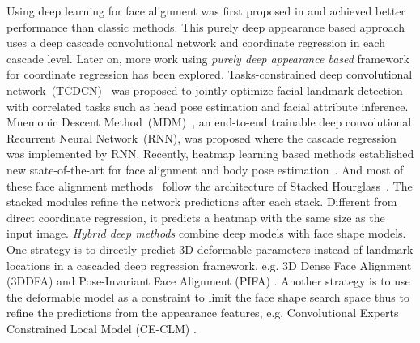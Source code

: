 \documentclass{article}
\begin{document}
Using deep learning for face alignment was first proposed in \cite{Sun13cnncFaceAlignment} and achieved better performance than classic methods. This purely deep appearance based approach uses a deep cascade convolutional network and coordinate regression in each cascade level. Later on, more work using \emph{purely deep appearance based} framework for coordinate regression has been explored. Tasks-constrained deep convolutional network~(TCDCN)~\cite{Zhang14TCDCN} was proposed to jointly optimize facial landmark detection with correlated tasks such as head pose estimation and facial attribute inference. Mnemonic Descent Method~(MDM)~\cite{Trigeorgis16MDM}, an end-to-end trainable deep convolutional Recurrent Neural Network~(RNN), was proposed where the cascade regression was implemented by RNN. Recently, heatmap learning based methods established new state-of-the-art for face alignment and body pose estimation~\cite{Tompson14heatmapPose,Newell16Hourglass,Wei16openpose}. And most of these face alignment methods~\cite{Bulat17FAN,wayne2018LAB} follow the architecture of Stacked Hourglass~\cite{Newell16Hourglass}. The stacked modules refine the network predictions after each stack. Different from direct coordinate regression, it predicts a heatmap with the same size as the input image. 
\emph{Hybrid deep methods} combine deep models with face shape models. One strategy is to directly predict 3D deformable parameters instead of landmark locations in a cascaded deep regression framework, e.g. 3D Dense Face Alignment (3DDFA) \cite{zhu17_3DDFA_300WLP} and Pose-Invariant Face Alignment (PIFA) \cite{Jourabloo2017PIFA}. Another strategy is to use the deformable model as a constraint to limit the face shape search space thus to refine the predictions from the appearance features, e.g. Convolutional Experts Constrained Local Model (CE-CLM) \cite{Zadeh2017CECLM}.
\end{document}
